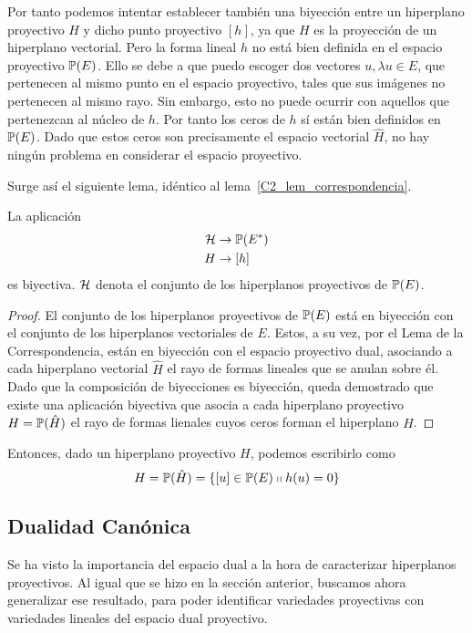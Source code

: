 Por tanto podemos intentar establecer también una biyección entre un hiperplano proyectivo $H$ y dicho punto proyectivo $[h]$, ya que $H$ es la proyección de un hiperplano vectorial. Pero la forma lineal $h$ no está bien definida en el espacio proyectivo $\mathbb{P}(E)$. Ello se debe a que puedo escoger dos vectores  $u, \lambda u\in E$, que pertenecen al mismo punto en el espacio proyectivo, tales que sus imágenes no pertenecen al mismo rayo. Sin embargo, esto no puede ocurrir con aquellos que pertenezcan al núcleo de $h$. Por tanto los ceros de $h$ sí están bien definidos en $\mathbb{P}(E)$. Dado que estos ceros son precisamente el espacio vectorial $\hat{H}$, no hay ningún problema en considerar el espacio proyectivo.

Surge así el siguiente lema, idéntico al lema~\ref{C2_lem_correspondencia}.
\begin{lem}
	\label{C2_lem_correspondenciaProy}
	La aplicación
	\begin{equation*}
		\begin{split}
			\mathcal{H}& \rightarrow \mathbb{P}(E^*)\\
			H &\rightarrow [h]
		\end{split}
	\end{equation*}
	es biyectiva. $\mathcal{H}$ denota el conjunto de los hiperplanos proyectivos de $\mathbb{P}(E)$.
\end{lem}
\begin{proof}
	El conjunto de los hiperplanos proyectivos de $\mathbb{P}(E)$ está en biyección con el conjunto de los hiperplanos vectoriales de $E$. Estos, a su vez, por el Lema de la Correspondencia, están en biyección con el espacio proyectivo dual, asociando a cada hiperplano vectorial $\hat{H}$ el rayo de formas lineales que se anulan sobre él. Dado que la composición de biyecciones es biyección, queda demostrado que existe una aplicación biyectiva que asocia a cada hiperplano proyectivo $H=\mathbb{P}(\hat{H})$ el rayo de formas lienales cuyos ceros forman el hiperplano  $\hat{H}$.
\end{proof}
Entonces, dado un hiperplano proyectivo $H$, podemos escribirlo como
\begin{equation}
H=\mathbb{P}(\hat{H})=\{[u]\in\mathbb{P}(E)\shortparallel h(u)=0\}
\end{equation}

\subsection{Dualidad Canónica}
Se ha visto la importancia del espacio dual a la hora de caracterizar hiperplanos proyectivos. Al igual que se hizo en la sección anterior, buscamos ahora generalizar ese resultado, para poder identificar variedades proyectivas con variedades lineales del espacio dual proyectivo.

